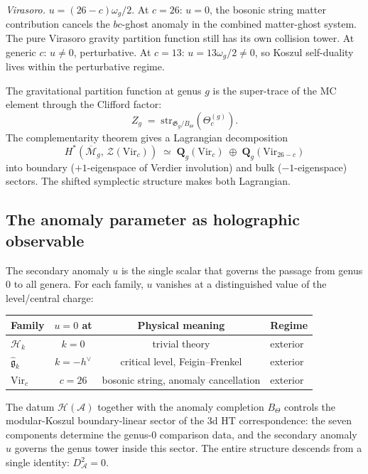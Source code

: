 \documentclass[11pt,reqno]{amsart}
\theoremstyle{definition}
\theoremstyle{remark}
\newcommand{\cA}{\mathcal{A}}
\newcommand{\cH}{\mathcal{H}}
\newcommand{\cM}{\mathcal{M}}
\newcommand{\cZ}{\mathcal{Z}}
\newcommand{\Vir}{\mathrm{Vir}}
\newcommand{\fg}{\mathfrak{g}}
\numberwithin{equation}{section}
\begin{document}
\smallskip
\noindent\emph{Virasoro.}\enspace
$u = (26-c)\omega_g/2$. At $c = 26$: $u = 0$, the bosonic string
matter contribution cancels the \(bc\)-ghost anomaly in the combined
matter-ghost system. The pure Virasoro gravity partition function
still has its own collision tower. At generic \(c\):
$u \neq 0$, perturbative. At $c = 13$: $u = 13\omega_g/2 \neq 0$,
so Koszul self-duality lives within the perturbative regime.

The gravitational partition function at genus $g$ is the
super-trace of the MC element through the Clifford factor:
\begin{equation}\label{eq:partition}
Z_g
\;=\;
\mathrm{str}_{\mathfrak{G}_g / B_\Theta}(\Theta^{(g)}_c).
\end{equation}
The complementarity theorem gives a Lagrangian decomposition
\begin{equation}\label{eq:lagrangian}
H^*(\overline{\cM}_g,\, \cZ(\Vir_c))
\;\simeq\;
\mathbf{Q}_g(\Vir_c)
\;\oplus\;
\mathbf{Q}_g(\Vir_{26-c})
\end{equation}
into boundary ($+1$-eigenspace of Verdier involution) and bulk
($-1$-eigenspace) sectors. The shifted symplectic structure makes
both Lagrangian.


\subsection{The anomaly parameter as holographic observable}
\label{subsec:anomaly-observable}

The secondary anomaly $u$ is the single scalar that governs the
passage from genus $0$ to all genera. For each family, $u$ vanishes
at a distinguished value of the level/central charge:

\begin{center}
\renewcommand{\arraystretch}{1.15}
\begin{tabular}{@{}lccl@{}}
\toprule
Family & $u = 0$ at & Physical meaning & Regime \\
\midrule
$\cH_k$ & $k = 0$ & trivial theory & exterior \\
$\widehat{\fg}_k$ & $k = -h^\vee$ & critical level, Feigin--Frenkel &
  exterior \\
$\Vir_c$ & $c = 26$ & bosonic string, anomaly cancellation &
  exterior \\
\bottomrule
\end{tabular}
\end{center}

\noindent
The datum $\cH(\cA)$ together with the anomaly completion
$B_\Theta$ controls the modular-Koszul boundary-linear sector of the
3d HT correspondence: the seven components determine the genus-$0$
comparison data, and the secondary anomaly \(u\) governs the genus
tower inside this sector. The entire structure descends from a single
identity: $D_{\cA}^2 = 0$.
\end{document}
